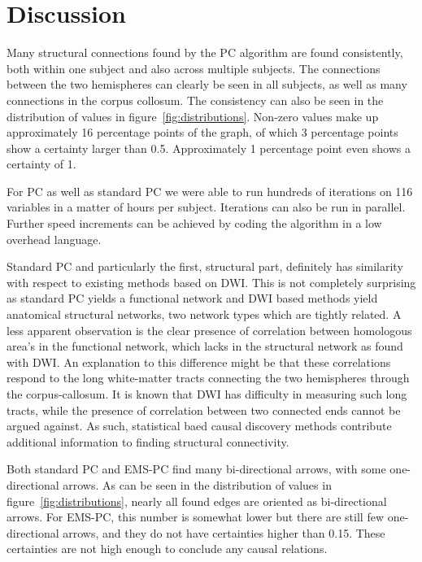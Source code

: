 \documentclass[a4paper, 10pt, english, onecolumn]{article}
\begin{document}
\section{Discussion}
Many structural connections found by the PC algorithm are found consistently, both within one subject and also across multiple subjects.
The connections between the two hemispheres can clearly be seen in all subjects, as well as many connections in the corpus collosum.
The consistency can also be seen in the distribution of values in figure~\ref{fig:distributions}.
Non-zero values make up approximately 16 percentage points of the graph, of which 3 percentage points show a certainty larger than 0.5.
Approximately 1 percentage point even shows a certainty of 1.


For PC as well as standard PC we were able to run hundreds of iterations on 116 variables in a matter of hours per subject.
Iterations can also be run in parallel.
Further speed increments can be achieved by coding the algorithm in a low overhead language.

Standard PC and particularly the first, structural part, definitely has similarity with respect to existing methods based on DWI.
This is not completely surprising as standard PC yields a functional network and DWI based methods yield anatomical structural networks, two network types which are tightly related.
A less apparent observation is the clear presence of correlation between homologous area's in the functional network, which lacks in the structural network as found with DWI.
An explanation to this difference might be that these correlations respond to the long white-matter tracts connecting the two hemispheres through the corpus-callosum.
It is known that DWI has difficulty in measuring such long tracts, while the presence of correlation between two connected ends cannot be argued against.
As such, statistical baed causal discovery methods contribute additional information to finding structural connectivity.

Both standard PC and EMS-PC find many bi-directional arrows, with some one-directional arrows.
As can be seen in the distribution of values in figure~\ref{fig:distributions}, nearly all found edges are oriented as bi-directional arrows.
For EMS-PC, this number is somewhat lower but there are still few one-directional arrows, and they do not have certainties higher than 0.15.
These certainties are not high enough to conclude any causal relations.
\end{document}
